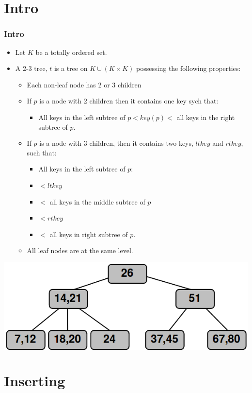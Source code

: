 \documentclass{beamer}
\begin{document}
\section{Intro}
\begin{frame}
\frametitle{Intro}
\begin{itemize}
\item Let $K$ be a totally ordered set.
\item A {\color{red} 2-3 tree}, $t$ is a tree on $K \cup (K \times K)$ possessing the following properties:
\begin{itemize}
\item Each non-leaf node has {\color{green} 2 or 3 children}
\item If $p$ is a node with 2 children then it contains one key sych that:
\begin{itemize}
\item All keys in the left subtree of $p < key(p) <$ all keys in the right subtree of $p$.
\end{itemize}
\item If $p$ is a node with 3 children, then it contains two keys, $ltkey$ and $rtkey$, such that:
\begin{itemize}
\item All keys in the left subtree of $p$:
\item $< ltkey$
\item $<$ all keys in the middle subtree of $p$
\item $< rtkey$
\item $<$ all keys in right subtree of $p$.
\end{itemize}
\item All leaf nodes are at the same level.
\end{itemize}
\end{itemize}
\includegraphics[scale=0.2]{btree.png}
\end{frame}

\section{Inserting}
\end{document}
